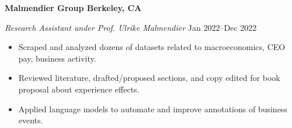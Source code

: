 \textbf{Malmendier Group \hfill Berkeley, CA}\par

\textit{Research Assistant under Prof. Ulrike Malmendier} \hfill Jan 2022--Dec 2022 \par
\begin{itemize}
	\item Scraped and analyzed dozens of datasets related to macroeconomics, CEO pay, business activity.
	\item Reviewed literature, drafted/proposed sections, and copy edited for book proposal about experience effects.
	\item Applied language models to automate and improve annotations of business events.
\end{itemize}\par